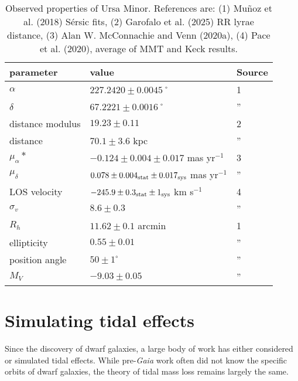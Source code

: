 \begin{table*}[t]
\centering
\caption[Observed Properties of Ursa Minor]{Observed properties of Ursa Minor. References are: (1) Muñoz et al. (2018) Sérsic fits, (2) Garofalo et al. (2025) RR lyrae distance, (3) Alan W. McConnachie and Venn (2020a), (4) Pace et al. (2020), average of MMT and Keck results. }
\label{tbl:umi_obs_props}
\begin{tabular}{lll}
\toprule
parameter & value & Source\\
\midrule
$\alpha$ & $ 227.2420 \pm 0.0045$˚ & 1\\
$\delta$ & $67.2221 \pm 0.0016$˚ & ”\\
distance modulus & $19.23 \pm 0.11$ & 2\\
distance & $70.1 \pm 3.6$ kpc & ”\\
$\mu_\alpha*$ & $-0.124 \pm 0.004 \pm 0.017$ mas yr$^{-1}$ & 3\\
$\mu_\delta$ & $0.078 \pm 0.004_{\rm stat} \pm 0.017_{\rm sys}$ mas yr$^{-1}$ & ”\\
LOS velocity & $-245.9 \pm 0.3_{\rm stat} \pm 1_{\rm sys}$ km s$^{-1}$ & 4\\
$\sigma_v$ & $8.6 \pm 0.3$ & ”\\
$R_h$ & $11.62 \pm 0.1$ arcmin & 1\\
ellipticity & $0.55 \pm 0.01$ & ”\\
position angle & $50 \pm 1^\circ$ & ”\\
$M_V$ & $-9.03 \pm 0.05$ & ”\\
\bottomrule
\end{tabular}
\end{table*}

\section{Simulating tidal effects}\label{simulating-tidal-effects}

Since the discovery of dwarf galaxies, a large body of work has either
considered or simulated tidal effects. While pre-\emph{Gaia} work often
did not know the specific orbits of dwarf galaxies, the theory of tidal
mass loss remains largely the same.

